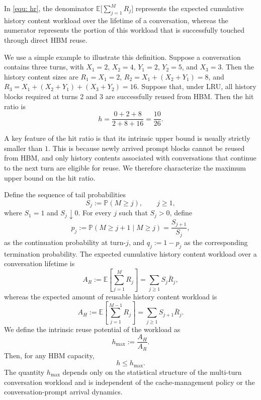 \documentclass{article}
\theoremstyle{definition}
\newcommand{\E}{\mathbb E}
\newcommand{\pro}{\mathbb P}
\begin{document}
In \eqref{equ:  hr}, the denominator $\E \Big[\sum\limits_{j=1}^{M} R_j\Big]$ represents the expected cumulative history content workload over the lifetime of a conversation, whereas the numerator represents the portion of this workload that is successfully touched through direct HBM reuse.


We use a simple example to illustrate this definition. Suppose a conversation contains three turns, with $X_1=2$, $X_2=4$, $Y_1=2$, $Y_2=5$, and $X_3=3$. Then the history content sizes are $R_1=X_1=2$, $R_2=X_1+(X_2+Y_1)=8$, and $R_3=X_1+(X_2+Y_1)+(X_3+Y_2)=16$. Suppose that, under LRU, all history blocks required at turns 2 and 3 are successfully reused from HBM. Then the  hit ratio is
\begin{equation*}
    h=\frac{0+2+8}{2+8+16}=\frac{10}{26}.
\end{equation*}

A key feature of the hit ratio is that its intrinsic upper bound is usually strictly smaller than $1$. This is because newly arrived prompt blocks cannot be reused from HBM, and only history contents associated with conversations that continue to the next turn are eligible for reuse. We therefore characterize the maximum upper bound on the hit ratio.

Define the sequence of tail probabilities 
\begin{equation}
    \label{equ: survival sequence}
    S_j:=\pro(M\geq j), \qquad j\geq 1,
\end{equation}
where $S_1=1$ and $S_j\downarrow 0$. For every $j$ such that $S_j>0$, define
\begin{equation}
    \label{equ: continuation probability at turn j}
    p_j:=\pro(M\geq j+1\mid M\geq j)=\frac{S_{j+1}}{S_j},
\end{equation}
as the continuation probability at turn-$j$, and $q_j:=1-p_j$ as the corresponding termination probability. The expected cumulative history content workload over a conversation lifetime is
\begin{equation}
    \label{equ: total number of blocks}
    A_R:= \mathbb{E} \left[ \sum\limits_{j=1}^M R_j \right ] =  \sum_{j\geq1}S_j\bar R_j,
\end{equation}
whereas the expected amount of reusable history content workload is
\begin{equation}
    \label{equ: number of blocks eligible for reuse}
    A_H:= \mathbb{E} \left[ \sum\limits_{j=1}^{M-1} R_j \right ] = \sum_{j\geq1}S_{j+1}\bar R_j.
\end{equation}
We define the intrinsic reuse potential of the workload as
\begin{equation}
    \label{equ: upper bound of all hit ratio}
    h_{\max}:=\frac{A_H}{A_R}.
\end{equation}
Then, for any HBM capacity,
\begin{equation*}
    h \leq h_{\max}.
\end{equation*}
The quantity $h_{\max}$ depends only on the statistical structure of the multi-turn conversation workload and is independent of the cache-management policy or the conversation-prompt arrival dynamics.
\end{document}
